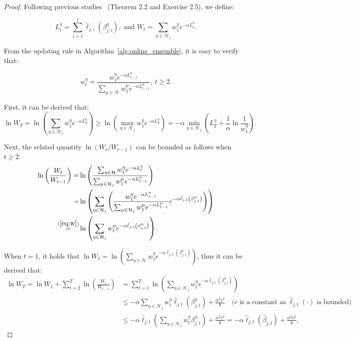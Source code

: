 \documentclass{article}
\theoremstyle{plain}
\theoremstyle{definition}
\theoremstyle{remark}
\begin{document}
\begin{proof}
Following previous studies~\citep{cesa2006prediction} (Theorem 2.2 and Exercise 2.5), we define: 

\[
  L_t^\eta=\sum_{i=1}^t \hat{\ell}_{j, i} \left(\beta^\eta_{j, i} \right), \text { and } W_t=\sum_{\eta \in \mathcal{H}_j} w_1^\eta e^{-\alpha L_t^\eta}.
\]

From the updating rule in Algorithm~\ref{alg:online_ensemble}, it is easy to verify that: 

\begin{equation}
  \label{eq:w}
  w_t^\eta=\frac{w_1^\eta e^{-\alpha L_{t-1}^\eta}}{\sum_{\mu \in \mathcal{H}} w_1^\mu e^{-\alpha L_{t-1}^\mu}},\  t \geq 2 .
\end{equation}

First, it can be derived that: 
\begin{equation}
  \label{eq:lower}
\ln W_T=\ln \left(\sum_{\eta \in \mathcal{H}_j} w_1^\eta e^{-\alpha L_T^\eta}\right) \geq \ln \left(\max _{\eta \in \mathcal{H}_j} w_1^\eta e^{-\alpha L_T^\eta}\right)=-\alpha \min _{\eta \in \mathcal{H}_j}\left(L_T^\eta+\frac{1}{\alpha} \ln \frac{1}{w_1^\eta}\right) .
\end{equation}

Next, the related quantity $\ln \left(W_t / W_{t-1}\right)$ can be bounded as follows when $t \geq 2$: 
\[
\begin{aligned}
\ln \left(\frac{W_t}{W_{t-1}}\right) 
= & \ln \left(\frac{\sum_{\eta \in \mathcal{H}} w_1^\eta e^{-\alpha L_t^\eta}}{\sum_{\mu \in \mathcal{H}_j} w_1^\mu e^{-\alpha L_{t-1}^\mu}}\right) \\
= & \ln \left(\sum_{\eta \in \mathcal{H}_j}\left(\frac{ w_1^\eta e^{-\alpha L_{t-1}^\eta }}{\sum_{\mu \in \mathcal{H}_j} w_1^\mu e^{-\alpha L_{t-1}^\mu}}e^{-\alpha \hat{\ell}_{j, t} \left(\beta_{j, t}^\eta\right)}\right)\right)  \\
\stackrel{(\ref{eq:w})}{=} &  \ln \left(\sum_{\eta \in \mathcal{H}_j} w_t^\eta e^{-\alpha \hat{\ell}_{j, t} \left(\beta_{j, t}^\eta\right)}\right) .
\end{aligned}
\]

When $t=1$, it holds that $\ln W_1=\ln \left(\sum_{\eta \in \mathcal{H}} w_1^\eta e^{-\alpha \hat{\ell}_{j, 1} \left(\beta_{j, 1}^\eta\right)}\right)$, thus it can be derived that: 
\begin{equation}
  \label{eq:upper}
\begin{aligned}
  \ln W_T=\ln W_1+\sum_{t=2}^T \ln \left(\frac{W_t}{W_{t-1}}\right) 
  & = \sum_{t=1}^T \ln \left(\sum_{\eta \in \mathcal{H}_j} w_t^\eta e^{-\alpha \hat{\ell}_{j, t} \left(\beta_{j, t}^\eta\right)}\right) \\
  & \leq-\alpha \sum_{\eta \in \mathcal{H}_j} w_t^\eta \hat{\ell}_{j, t} \left(\beta_{j, t}^\eta\right) + \frac{\alpha^2 c^2}{8} \quad \text{($c$ is a constant as $\hat{\ell}_{j, t}(\cdot)$ is bounded)}\\
  & \leq-\alpha \hat{\ell}_{j, t}\left(\sum_{\eta \in \mathcal{H}_j} w_t^\eta \beta_{j, t}^\eta\right)+\frac{\alpha^2 c^2}{8}
  =-\alpha \hat{\ell}_{j, t}\left(\hat{\beta}_{j, t}\right)+\frac{\alpha^2 c^2}{8}, 
\end{aligned}
\end{equation}


\end{proof}
\end{document}
